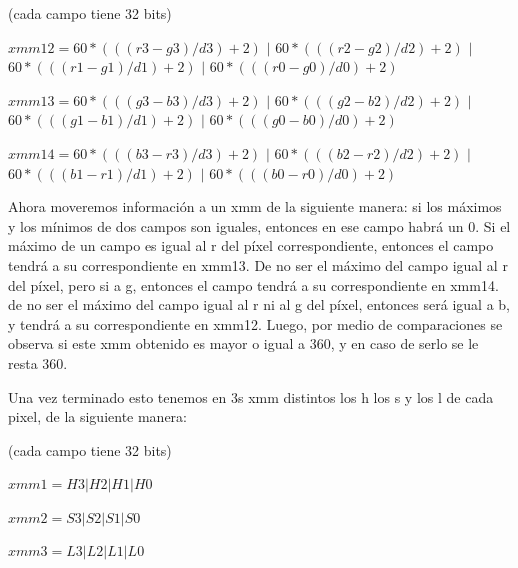\documentclass[a4paper]{article}
\begin{document}
\begin{enumerate}
\vspace*{0.3cm}

(cada campo tiene 32 bits)	
	
\vspace*{0.3cm}	

$xmm12=60*(((r3-g3)/d3)+2)$ $|$ $60*(((r2-g2)/d2)+2)$ $|$ $60*(((r1-g1)/d1)+2)$ $|$ $60*(((r0-g0)/d0)+2)$

\vspace*{0.3cm} 
 
$xmm13=60*(((g3-b3)/d3)+2)$ $|$ $60*(((g2-b2)/d2)+2)$ $|$ $60*(((g1-b1)/d1)+2)$ $|$ $60*(((g0-b0)/d0)+2)$

\vspace*{0.3cm}

$xmm14=60*(((b3-r3)/d3)+2)$ $|$ $60*(((b2-r2)/d2)+2)$ $|$ $60*(((b1-r1)/d1)+2)$ $|$ $60*(((b0-r0)/d0)+2)$	
	
\vspace*{0.3cm}
	 
	 Ahora moveremos información a un xmm de la siguiente manera: si los máximos y los mínimos de dos campos son iguales, entonces en ese campo habrá un 0. Si el máximo de un campo es igual al r del píxel correspondiente, entonces el campo tendrá a su correspondiente en xmm13. De no ser el máximo del campo igual al r del píxel, pero si a g, entonces el campo tendrá a su correspondiente en xmm14. de no ser el máximo del campo igual al r ni al g del píxel, entonces será igual a b, y tendrá a su correspondiente en xmm12. Luego, por medio de comparaciones se observa si este xmm obtenido es mayor o igual a 360, y en caso de serlo se le resta 360.
	
\end{enumerate}

Una vez terminado esto tenemos en 3s xmm distintos los h los s y los l de cada pixel, de la siguiente manera:

\vspace*{0.3cm}

(cada campo tiene 32 bits)	
	
\vspace*{0.3cm}	

$xmm1 = H3|H2|H1|H0$

\vspace*{0.3cm}

$xmm2 = S3|S2|S1|S0$

\vspace*{0.3cm}

$xmm3 = L3|L2|L1|L0$

\vspace*{0.3cm}
\end{document}
